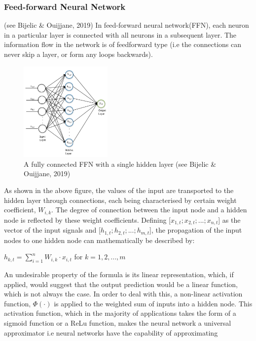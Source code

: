 \documentclass[a4paper,11pt,oneside]{book}
\begin{document}
 \subsubsection{Feed-forward Neural Network} (see Bijelic \& Ouijjane, 2019)
 In feed-forward neural network(FFN), each neuron in a
 particular layer is connected with all neurons in a subsequent layer. The information
 flow in the network is of feedforward type (i.e the connections
 can never skip a layer, or form any loops backwards).
 \newpage
 \begin{figure}
 	\centering
 	\includegraphics[width=0.4\textwidth]{figures/FFN}
 	\caption{A fully connected FFN with a single hidden layer (see Bijelic \& Ouijjane, 2019)}
 		\label{sixthfig}
 \end{figure}
 As shown in the above figure, the values of the input are transported to the hidden layer through connections, each being characterised by certain weight coefficient, $W_{i,k}$. The degree of connection between the input node and a hidden node is reflected by these weight coefficients. Defining [$x_{1,t};x_{2,t};...;x_{n,t}$] as the vector of the input signals and [$h_{1,t};h_{2,t};...;h_{m,t}$], the propagation of the input nodes to one hidden node can
 mathematically be described by: 
 \begin{center}


 $h_{k,t} =\sum_{i=1}^{n} W_{i,k} \cdot x_{i,t}$ for $k = 1,2,...,m$
  \end{center}
An undesirable property of the formula is its linear representation,
which, if applied, would suggest that the output prediction would be a linear function, which is not always the case. In order to deal with this, a non-linear activation function, $\Phi(\cdot)$ is applied to the weighted sum of
inputs into a hidden node. This activation function, which in the majority of
applications takes the form of a sigmoid function or a ReLu function, makes the neural network a universal approximator i.e neural networks have the capability of approximating
\end{document}
